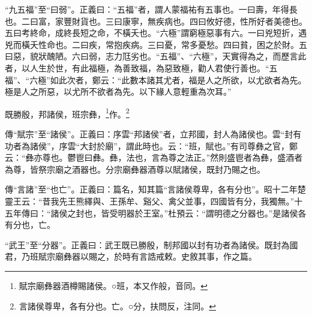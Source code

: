 {\noindent\shu{}\fzkt “九五福”至“曰弱”。正義曰：“五福”者，謂人蒙福祐有五事也。一曰壽，年得長也。二曰富，家豐財貨也。三曰康寧，無疾病也。四曰攸好德，性所好者美德也。五曰考終命，成終長短之命，不橫夭也。“六極”謂窮極惡事有六。一曰兇短折，遇兇而橫夭性命也。二曰疾，常抱疾病。三曰憂，常多憂愁。四曰貧，困之於財。五曰惡，貌狀醜陋。六曰弱，志力尫劣也。“五福”、“六極”，天實得為之，而歷言此者，以人生於世，有此福極，為善致福，為惡致極，勸人君使行善也。“五福”、“六極”如此次者，鄭云：“此數本諸其尤者，福是人之所欲，以尤欲者為先。極是人之所惡，以尤所不欲者為先。以下緣人意輕重為次耳。” \par}

既勝殷，邦諸侯，班宗彝，\footnote{賦宗廟彝器酒樽賜諸侯。○班，本又作般，音同。}作。\footnote{言諸侯尊卑，各有分也。亡。○分，扶問反，注同。}

{\noindent\zhuan{}\fzbyks 傳“賦宗”至“諸侯”。正義曰：序雲“邦諸侯”者，立邦國，封人為諸侯也。雲“封有功者為諸侯”，序雲“大封於廟”，謂此時也。云：“班，賦也。”有司尊彝之官，鄭云：“彝亦尊也。鬱鬯曰彝。彝，法也，言為尊之法正。”然則盛鬯者為彝，盛酒者為尊，皆祭宗廟之酒器也。分宗廟彝器酒尊以賦諸侯，既封乃賜之也。 \par}

{\noindent\zhuan{}\fzbyks 傳“言諸”至“也亡”。正義曰：篇名，知其篇“言諸侯尊卑，各有分也”。昭十二年楚靈王云：“昔我先王熊繹與、王孫牟、谿父、禽父並事，四國皆有分，我獨無。”十五年傳曰：“諸侯之封也，皆受明器於王室。”杜預云：“謂明德之分器也。”是諸侯各有分也，亡。 \par}

{\noindent\shu{}\fzkt “武王”至“分器”。正義曰：武王既已勝殷，制邦國以封有功者為諸侯。既封為國君，乃班賦宗廟彝器以賜之，於時有言誥戒敕。史敘其事，作之篇。 \par}

